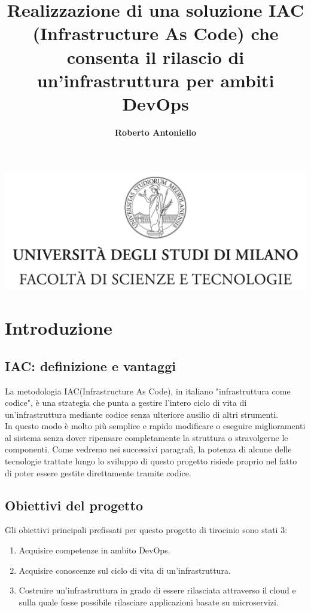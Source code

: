 \documentclass[a4paper,12pt]{report}
\begin{document}
\includegraphics[width=\textwidth]{Logo.jpg}
\title{Realizzazione di una soluzione IAC (Infrastructure As Code) che consenta il rilascio di un'infrastruttura per ambiti DevOps}
\author{\textbf{Roberto Antoniello}}

\beforepreface

\afterpreface
% 
% 
% 
\chapter{Introduzione}
\section{IAC: definizione e vantaggi}
La metodologia IAC(Infrastructure As Code), in italiano "infrastruttura come codice", è una strategia che punta a gestire l'intero ciclo di vita di un'infrastruttura mediante codice senza ulteriore ausilio di altri strumenti. \\ In questo modo è molto più semplice e rapido modificare o eseguire miglioramenti al sistema senza dover ripensare completamente la struttura o stravolgerne le componenti.
Come vedremo nei successivi paragrafi, la potenza di alcune delle tecnologie trattate lungo lo sviluppo di questo progetto risiede proprio nel fatto di poter essere gestite direttamente tramite codice.
\section{Obiettivi del progetto}
Gli obiettivi principali prefissati per questo progetto di tirocinio sono stati 3:
\begin{enumerate}
\item Acquisire competenze in ambito DevOps.
\item Acquisire conoscenze sul ciclo di vita di un'infrastruttura.
\item Costruire un'infrastruttura in grado di essere rilasciata attraverso il cloud e sulla quale fosse possibile rilasciare applicazioni basate su microservizi.
\end{enumerate}
\end{document}
